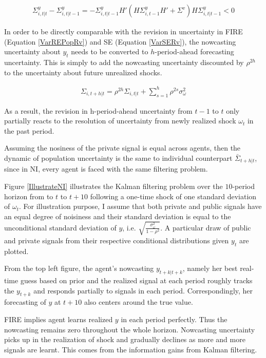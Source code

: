 \documentclass[12pt]{article}
\begin{document}
	\begin{eqnarray}\label{VarNIRv}
		\Sigma^y_{i,t|t} - \Sigma^y_{i,t|t-1} = - \Sigma^y_{i,t|t-1} H'(H \Sigma^y_{i,t-1} H' +\Sigma^v) H \Sigma^y_{i,t|t-1} <0
	\end{eqnarray}
	
	In order to be directly comparable with the revision in uncertainty in FIRE (Equation \ref{VarREPopRv}) and SE (Equation \ref{VarSERv}), the nowcasting uncertainty about $y_t$ needs to be converted to $h$-period-ahead forecasting uncertainty. This is simply to add the nowcasting uncertainty discounted by $\rho^{2h}$ to the uncertainty about future unrealized shocks.   
	
	\begin{eqnarray}\label{VarNIEq}
		\Sigma_{i,t+h|t} = \rho^{2h} \Sigma_{i,t|t} + \sum^{h}_{s=1}\rho^{2s} \sigma^2_{\omega}
	\end{eqnarray}
	
	As a result, the revision in h-period-ahead uncertainty from $t-1$ to $t$ only partially reacts to the resolution of  uncertainty from newly realized shock $\omega_t$ in the past period. 
	
	Assuming the nosiness of the private signal is equal across agents, then the dynamic of population uncertainty is the same to individual counterpart $\bar \Sigma_{t+h|t}$, since in NI, every agent is faced with the same filtering problem.  
	
	Figure \ref{IllustrateNI} illustrates the Kalman filtering problem over the $10$-period horizon from to $t$ to $t+10$  following a one-time shock of one standard deviation of $\omega_t$.  For illustration purpose, I assume that both private and public signals have an equal degree of noisiness and their standard deviation is equal to the unconditional standard deviation of $y$, i.e. $\sqrt{\frac{\sigma^2_\omega}{1-\rho^2}}$.  A particular draw of public and private signals from their respective conditional distributions given $y_t$ are plotted.    
	
	From the top left figure, the agent's nowcasting $y_{t+k|t+k}$, namely her best real-time guess based on prior and the realized signal at each period roughly tracks the $y_{t+k}$ and responds partially to signals in each period. Correspondingly, her forecasting of $y$ at $t+10$ also centers around the true value. 
	
	FIRE implies agent learns realized $y$ in each period perfectly. Thus the nowcasting remains zero throughout the whole horizon. Nowcasting uncertainty picks up in the realization of shock and gradually declines as more and more signals are learnt. This comes from the information gains from Kalman filtering. 
	
\end{document}
